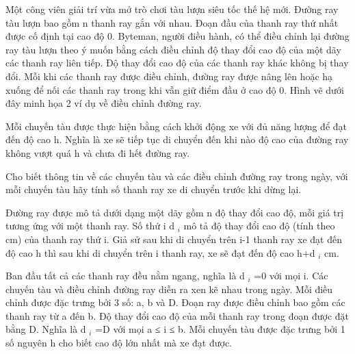 Một công viên giải trí vừa mở trò chơi tàu lượn siêu tốc thế hệ mới. Đường ray tàu lượn bao gồm n thanh ray gắn với   nhau. Đoạn đầu của thanh ray thứ nhất được cố định tại cao độ 0. Byteman, người điều hành, có thể điều chỉnh lại đường   ray tàu lượn theo ý muốn bằng cách điều chỉnh       độ thay đổi cao độ      của một dãy các thanh ray liên tiếp. Độ thay   đổi cao độ của các thanh ray khác không bị thay đổi. Mỗi khi các thanh ray được điều chỉnh, đường ray được nâng lên   hoặc hạ xuống để nối các thanh ray trong khi vẫn giữ điểm đầu ở cao độ 0. Hình vẽ dưới đây minh họa 2 ví dụ về điều  chỉnh đường ray.  

   Mỗi chuyến tàu được thực hiện bằng cách khởi động xe với đủ năng lượng để đạt đến độ cao h. Nghĩa là xe sẽ tiếp tục   di chuyển đến khi nào độ cao của đường ray không vượt quá h và chưa đi hết đường ray.  

   Cho biết thông tin về các chuyến tàu và các điều chỉnh đường ray trong ngày, với mỗi chuyến tàu hãy tính số thanh ray   xe di chuyển trước khi dừng lại.  

   Đường ray được mô tả dưới dạng một dãy gồm n độ thay đổi cao độ, mỗi giá trị tương ứng với một thanh ray. Số thứ i   d   $_    i   $   mô tả độ thay đổi cao độ (tính theo cm) của thanh ray thứ i. Giả sử sau khi di chuyển trên i-1 thanh ray xe   đạt đến độ cao h thì sau khi di chuyển trên i thanh ray, xe sẽ đạt đến độ cao h+d   $_    i   $   cm.  

   Ban đầu tất cả các thanh ray đều nằm ngang, nghĩa là d   $_    i   $   =0 với mọi i. Các chuyến tàu và điều chỉnh đường   ray diễn ra xen kẽ nhau trong ngày. Mỗi điều chỉnh được đặc trưng bởi 3 số: a, b và D. Đoạn ray được điều chỉnh bao gồm   các thanh ray từ a đến b. Độ thay đổi cao độ của mỗi thanh ray trong đoạn được đặt bằng D. Nghĩa là d   $_    i   $   =D   với mọi a ≤ i ≤ b. Mỗi chuyến tàu được đặc trưng bởi 1 số nguyên h cho biết cao độ lớn nhất mà xe đạt được.